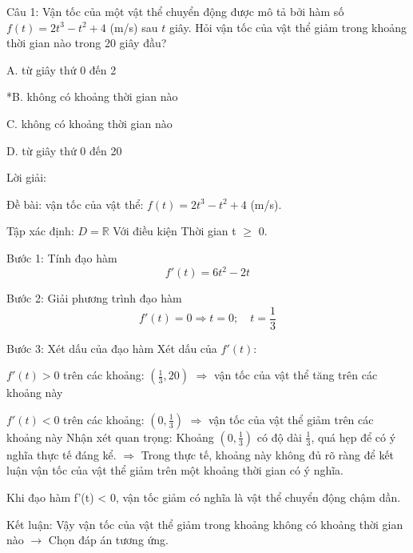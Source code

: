 Câu 1: Vận tốc của một vật thể chuyển động được mô tả bởi hàm số \(f(t) = 2t^{3}- t^{2}+ 4\) (m/s) sau \(t\) giây. 
        Hỏi vận tốc của vật thể giảm trong khoảng thời gian nào trong 20 giây đầu?

A. từ giây thứ 0 đến 2

*B. không có khoảng thời gian nào

C. không có khoảng thời gian nào

D. từ giây thứ 0 đến 20

Lời giải:

Đề bài: vận tốc của vật thể: \(f(t) = 2t^{3}- t^{2}+ 4\) (m/s).

Tập xác định: \(D = \mathbb{R}\)
Với điều kiện Thời gian t \(\geq\) 0.

Bước 1: Tính đạo hàm
\[
f'(t) = 6t^{2}- 2t
\]

Bước 2: Giải phương trình đạo hàm
\[
f'(t) = 0 \Rightarrow t = 0; \quad t = \frac{1}{3}
\]



Bước 3: Xét dấu của đạo hàm
Xét dấu của \(f'(t)\):

\(f'(t) > 0\) trên các khoảng: \((\frac{1}{3}, 20)\)
  \(\Rightarrow\) vận tốc của vật thể tăng trên các khoảng này

\(f'(t) < 0\) trên các khoảng: \((0, \frac{1}{3})\)
  \(\Rightarrow\) vận tốc của vật thể giảm trên các khoảng này
  Nhận xét quan trọng: Khoảng \((0, \frac{1}{3})\) có độ dài \(\frac{1}{3}\), quá hẹp để có ý nghĩa thực tế đáng kể.
  \(\Rightarrow\) Trong thực tế, khoảng này không đủ rõ ràng để kết luận vận tốc của vật thể giảm trên một khoảng thời gian có ý nghĩa.

Khi đạo hàm f'(t) < 0, vận tốc giảm có nghĩa là vật thể chuyển động chậm dần.

Kết luận: Vậy vận tốc của vật thể giảm trong khoảng không có khoảng thời gian nào \(\rightarrow\) Chọn đáp án tương ứng.

